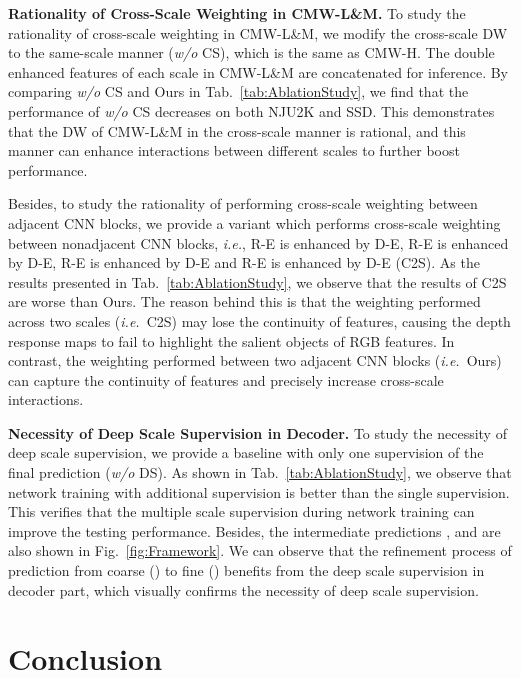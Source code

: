 \documentclass[runningheads]{llncs}
\newcommand{\ie}{\emph{i.e.}}
\begin{document}
 

\noindent\textbf{Rationality of Cross-Scale Weighting in CMW-L\&M.}
To study the rationality of cross-scale weighting in CMW-L\&M,
we modify the cross-scale DW to the same-scale
manner (\textit{w/o} CS), which is the same as CMW-H.
The double enhanced features of each scale in CMW-L\&M
are concatenated for inference.
By comparing \textit{w/o} CS and Ours in Tab.~\ref{tab:AblationStudy},
we find that the performance of \textit{w/o} CS decreases on both
NJU2K and SSD.
This demonstrates that the DW of CMW-L\&M in the
cross-scale manner is rational, and this manner can enhance
interactions between different scales to further
boost performance.


Besides, to study the rationality of performing cross-scale weighting
between adjacent CNN blocks, we provide a variant which performs cross-scale
weighting between nonadjacent CNN blocks,
\ie, R-E is enhanced by D-E,
R-E is enhanced by D-E,
R-E is enhanced by D-E and
R-E is enhanced by D-E (C2S).
As the results presented in Tab.~\ref{tab:AblationStudy}, we observe that the
results of C2S are worse than Ours.
The reason behind this is that the weighting performed across two scales (\ie~C2S) 
may lose the continuity of features, causing the depth response maps to fail to
highlight the salient objects of RGB features.
In contrast, the weighting performed between two adjacent CNN blocks (\ie~Ours)
can capture the continuity of features and precisely increase cross-scale interactions.



\noindent\textbf{Necessity of Deep Scale Supervision in Decoder.}
To study the necessity of deep scale supervision, we provide a baseline
with only one supervision of the final prediction  (\textit{w/o} DS).
As shown in Tab.~\ref{tab:AblationStudy}, we observe that network training
with additional supervision is better than the single supervision.
This verifies that the multiple scale supervision during network training can
improve the testing performance.
Besides, the intermediate predictions ,  and 
are also shown in Fig.~\ref{fig:Framework}.
We can observe that the refinement process of
prediction from coarse () to fine () benefits from the deep scale
supervision in decoder part, which visually confirms the necessity of deep scale supervision.





\section{Conclusion}
\end{document}
